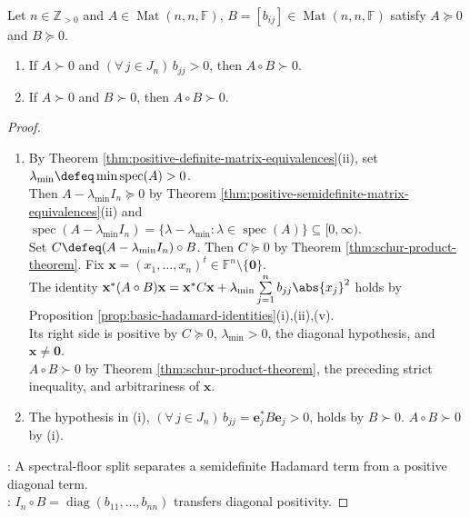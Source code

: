 \begin{corollary} \label{cor:hadamard-positive-definite-criterion} \\
Let $n\in\mathbb{Z}_{>0}$ and $A\in\operatorname{Mat}(n,n,\mathbb{F})$, $B=[b_{ij}]\in\operatorname{Mat}(n,n,\mathbb{F})$ satisfy $A\succeq0$ and $B\succeq0$.
\begin{enumerate}[label=(\roman*)]
\setlength{\itemsep}{0pt}
\item If $A\succ0$ and $(\forall\,j\in J_n)\,b_{jj}>0$, then $A\circ B\succ0$.
\item If $A\succ0$ and $B\succ0$, then $A\circ B\succ0$.
\end{enumerate}
\begin{proof}
\begin{enumerate}[label=(\roman*)]
\setlength{\itemsep}{0pt}
\item By Theorem \ref{thm:positive-definite-matrix-equivalences}(ii), set $\lambda_{\min}\defeq\min\operatorname{spec}(A)>0$.\\
Then $A-\lambda_{\min}I_n\succeq0$ by Theorem \ref{thm:positive-semidefinite-matrix-equivalences}(ii) and $\operatorname{spec}(A-\lambda_{\min}I_n)=\{\lambda-\lambda_{\min}:\lambda\in\operatorname{spec}(A)\}\subseteq[0,\infty)$.\\
Set $C\defeq(A-\lambda_{\min}I_n)\circ B$. Then $C\succeq0$ by Theorem \ref{thm:schur-product-theorem}. Fix $\mathbf{x}=(x_1,\ldots,x_n)^t\in\mathbb{F}^n\setminus\{\mathbf{0}\}$.\\
The identity $\mathbf{x}^*(A\circ B)\mathbf{x}=\mathbf{x}^*C\mathbf{x}+\lambda_{\min}\sum\limits_{j=1}^{n}b_{jj}\abs{x_j}^2$ holds by Proposition \ref{prop:basic-hadamard-identities}(i),(ii),(v).\\
Its right side is positive by $C\succeq0$, $\lambda_{\min}>0$, the diagonal hypothesis, and $\mathbf{x}\neq\mathbf{0}$.\\
$A\circ B\succ0$ by Theorem \ref{thm:schur-product-theorem}, the preceding strict inequality, and arbitrariness of $\mathbf{x}$.
\item The hypothesis in (i), $(\forall\,j\in J_n)\,b_{jj}=\mathbf{e}_j^*B\mathbf{e}_j>0$, holds by $B\succ0$. $A\circ B\succ0$ by (i).
\end{enumerate}
: A spectral-floor split separates a semidefinite Hadamard term from a positive diagonal term.\\
: $I_n\circ B=\operatorname{diag}(b_{11},\ldots,b_{nn})$ transfers diagonal positivity.
\end{proof}
\end{corollary}

